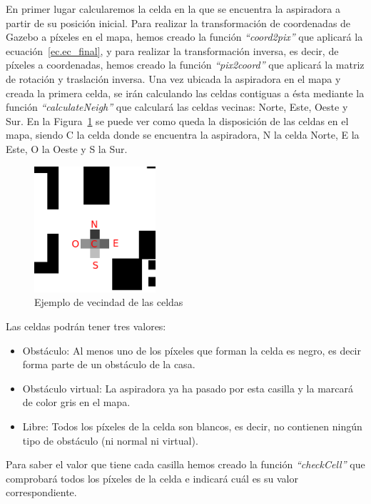 En primer lugar calcularemos la celda en la que se encuentra la aspiradora a partir de su posición inicial. Para realizar la transformación de coordenadas de Gazebo a píxeles en el mapa, hemos creado la función \textit{``coord2pix''} que aplicará la ecuación~\ref{ec.ec_final}, y para realizar la transformación inversa, es decir, de píxeles a coordenadas, hemos creado la función \textit{``pix2coord''} que aplicará la matriz de rotación y traslación inversa. Una vez ubicada la aspiradora en el mapa y creada la primera celda, se irán calculando las celdas contiguas a ésta mediante la función \textit{``calculateNeigh''} que calculará las celdas vecinas: Norte, Este, Oeste y Sur. En la Figura~\ref{fig.neighZoom} se puede ver como queda la disposición de las celdas en el mapa, siendo C la celda donde se encuentra la aspiradora, N la celda Norte, E la Este, O la Oeste y S la Sur.

\begin{figure}[H]
  \begin{center}
    \includegraphics[width=0.4\textwidth]{figures/Vacuum/neighZoom.png}
		\caption{Ejemplo de vecindad de las celdas}
		\label{fig.neighZoom}
		\end{center}
\end{figure}

Las celdas podrán tener tres valores:

\begin{itemize}
\item Obstáculo: Al menos uno de los píxeles que forman la celda es negro, es decir forma parte de un obstáculo de la casa.
\item Obstáculo virtual: La aspiradora ya ha pasado por esta casilla y la marcará de color gris en el mapa. 
\item Libre: Todos los píxeles de la celda son blancos, es decir, no contienen ningún tipo de obstáculo (ni normal ni virtual).
\end{itemize}

Para saber el valor que tiene cada casilla hemos creado la función \textit{``checkCell''} que comprobará todos los píxeles de la celda e indicará cuál es su valor correspondiente.\\

